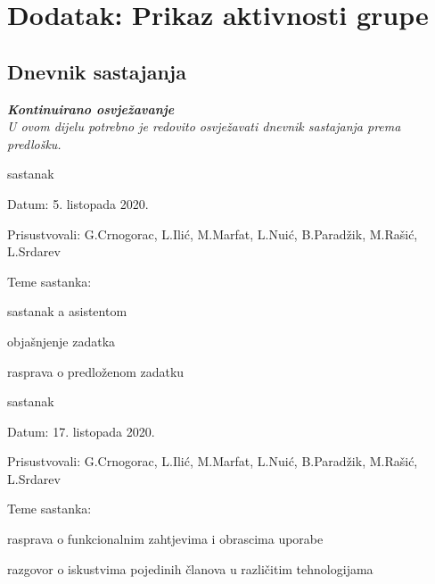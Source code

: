 \chapter*{Dodatak: Prikaz aktivnosti grupe}
		
		\section*{Dnevnik sastajanja}
		
		\textbf{\textit{Kontinuirano osvježavanje}}\\
		
		 \textit{U ovom dijelu potrebno je redovito osvježavati dnevnik sastajanja prema predlošku.}
		
		\begin{packed_enum}
			\item  sastanak
			\item[] \begin{packed_item}
				\item Datum: 5. listopada 2020.
				\item Prisustvovali: G.Crnogorac, L.Ilić, M.Marfat, L.Nuić, B.Paradžik, M.Rašić, L.Srdarev
				\item Teme sastanka:
				\begin{packed_item}
					\item  sastanak a asistentom
					\item  objašnjenje zadatka
					\item  rasprava o predloženom zadatku
				\end{packed_item}
			\end{packed_item}
			
			\item  sastanak
			\item[] \begin{packed_item}
				\item Datum: 17. listopada 2020.
				\item Prisustvovali: G.Crnogorac, L.Ilić, M.Marfat, L.Nuić, B.Paradžik, M.Rašić, L.Srdarev
				\item Teme sastanka:
				\begin{packed_item}
					\item  rasprava o funkcionalnim zahtjevima i obrascima uporabe
					\item  razgovor o iskustvima pojedinih članova u različitim tehnologijama
				\end{packed_item}
			\end{packed_item}
			

\end{packed_enum}
